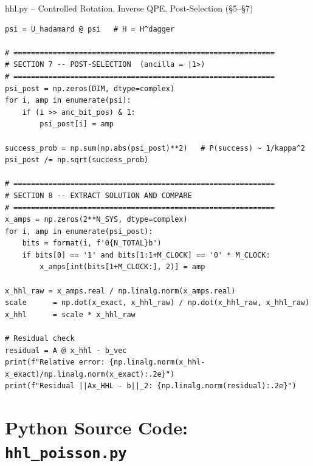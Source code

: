 \documentclass{beamer}
\begin{document}
\begin{frame}{hhl.py -- Controlled Rotation, Inverse QPE, Post-Selection (\S5--\S7)}
\begin{lstlisting}
psi = U_hadamard @ psi   # H = H^dagger

# ============================================================
# SECTION 7 -- POST-SELECTION  (ancilla = |1>)
# ============================================================
psi_post = np.zeros(DIM, dtype=complex)
for i, amp in enumerate(psi):
    if (i >> anc_bit_pos) & 1:
        psi_post[i] = amp

success_prob = np.sum(np.abs(psi_post)**2)   # P(success) ~ 1/kappa^2
psi_post /= np.sqrt(success_prob)

# ============================================================
# SECTION 8 -- EXTRACT SOLUTION AND COMPARE
# ============================================================
x_amps = np.zeros(2**N_SYS, dtype=complex)
for i, amp in enumerate(psi_post):
    bits = format(i, f'0{N_TOTAL}b')
    if bits[0] == '1' and bits[1:1+M_CLOCK] == '0' * M_CLOCK:
        x_amps[int(bits[1+M_CLOCK:], 2)] = amp

x_hhl_raw = x_amps.real / np.linalg.norm(x_amps.real)
scale      = np.dot(x_exact, x_hhl_raw) / np.dot(x_hhl_raw, x_hhl_raw)
x_hhl      = scale * x_hhl_raw

# Residual check
residual = A @ x_hhl - b_vec
print(f"Relative error: {np.linalg.norm(x_hhl-x_exact)/np.linalg.norm(x_exact):.2e}")
print(f"Residual ||Ax_HHL - b||_2: {np.linalg.norm(residual):.2e}")
\end{lstlisting}
\end{frame}


\section{Python Source Code: \texttt{hhl\_poisson.py}}
\end{document}
